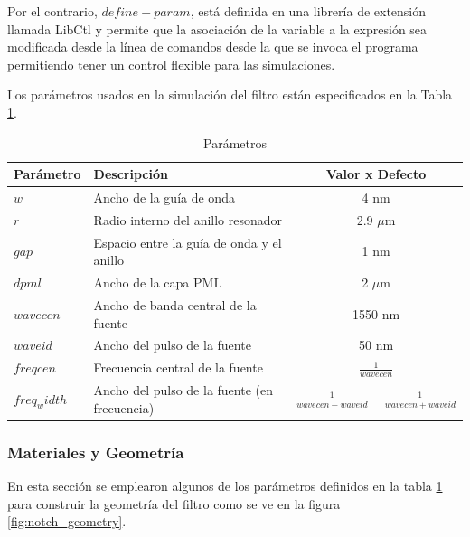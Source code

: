 Por el contrario, $define-param$, está definida en una librería de extensión llamada LibCtl y permite que la 
asociación de la variable a la expresión sea modificada desde la línea de comandos desde la que se invoca el 
programa permitiendo tener un control flexible para las simulaciones. 

Los parámetros usados en la simulación del filtro están especificados en 
la Tabla \ref{tb:meep_params}.

\begin{table}[H]
\centering
\begin{tabular}{| l | l | c | }
\hline
Parámetro & Descripción & Valor x Defecto \\
\hline
$w$ &	Ancho de la guía de onda &  4 nm \\
$r$ &	Radio interno del anillo resonador &	2.9 $\mu$m \\
$gap$ &	Espacio entre la guía de onda y el anillo & 1 nm \\
$dpml$ &    Ancho de la capa PML &  2  $\mu$m \\
$wavecen$ & Ancho de banda central de la fuente &   1550 nm \\
$waveid$ &  Ancho del pulso de la fuente &  50 nm \\
$freqcen$ & Frecuencia central de la fuente &	$\frac{1}{wavecen}$ \\
$freq_width$ &	Ancho del pulso de la fuente (en frecuencia) &	$\frac{1}{wavecen-waveid} - \frac{1}{wavecen+waveid}$ \\
\hline
\end{tabular}
\caption{Parámetros}
\label{tb:meep_params}
\end{table}


\subsubsection{Materiales y Geometría}

En esta sección se emplearon algunos de los parámetros definidos en
la tabla \ref{tb:meep_params} para construir la geometría del filtro como se ve en
la figura \ref{fig:notch_geometry}.

